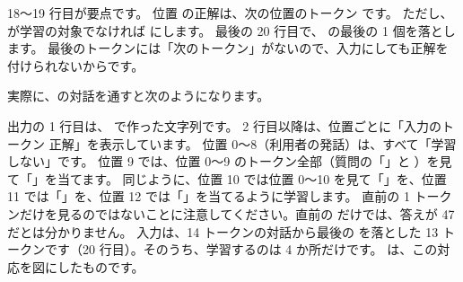 18〜19 行目が要点です。
位置  の正解は、次の位置のトークン  です。
ただし、 が学習の対象でなければ  にします。
最後の 20 行目で、 の最後の 1 個を落とします。
最後のトークンには「次のトークン」がないので、入力にしても正解を付けられないからです。

実際に、の対話を通すと次のようになります。



出力の 1 行目は、 で作った文字列です。
2 行目以降は、位置ごとに「入力のトークン \code{->} 正解」を表示しています。
位置 0〜8（利用者の発話）は、すべて「学習しない」です。
位置 9 では、位置 0〜9 のトークン全部（質問の「」と ）を見て「」を当てます。
同じように、位置 10 では位置 0〜10 を見て「」を、位置 11 では「」を、位置 12 では「」を当てるように学習します。
直前の 1 トークンだけを見るのではないことに注意してください。直前の  だけでは、答えが 47 だとは分かりません。
入力は、14 トークンの対話から最後の  を落とした 13 トークンです（20 行目）。そのうち、学習するのは 4 か所だけです。
は、この対応を図にしたものです。

